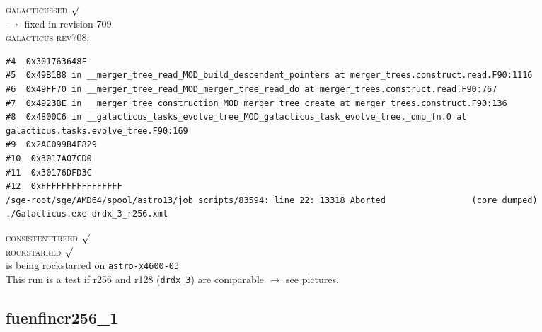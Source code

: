 \textsc{galacticussed} $\surd$ \\
$\rightarrow$ fixed in revision 709 \\

\textsc{galacticus rev708:} \\
\begin{verbatim}
#4  0x301763648F
#5  0x49B1B8 in __merger_tree_read_MOD_build_descendent_pointers at merger_trees.construct.read.F90:1116
#6  0x49FF70 in __merger_tree_read_MOD_merger_tree_read_do at merger_trees.construct.read.F90:767
#7  0x4923BE in __merger_tree_construction_MOD_merger_tree_create at merger_trees.construct.F90:136
#8  0x4800C6 in __galacticus_tasks_evolve_tree_MOD_galacticus_task_evolve_tree._omp_fn.0 at galacticus.tasks.evolve_tree.F90:169
#9  0x2AC099B4F829
#10  0x3017A07CD0
#11  0x30176DFD3C
#12  0xFFFFFFFFFFFFFFFF
/sge-root/sge/AMD64/spool/astro13/job_scripts/83594: line 22: 13318 Aborted                 (core dumped) ./Galacticus.exe drdx_3_r256.xml
\end{verbatim}
\textsc{consistenttreed} $\surd$ \\
\textsc{rockstarred} $\surd$ \\
is being rockstarred on \texttt{astro-x4600-03} \\
This run is a test if r256 and r128 (\texttt{drdx\_3}) 
are comparable $\rightarrow$ see pictures. \\
	
% 
%
%
%
%
%
%
%


\newpage
\subsection{fuenfincr256\_1}

